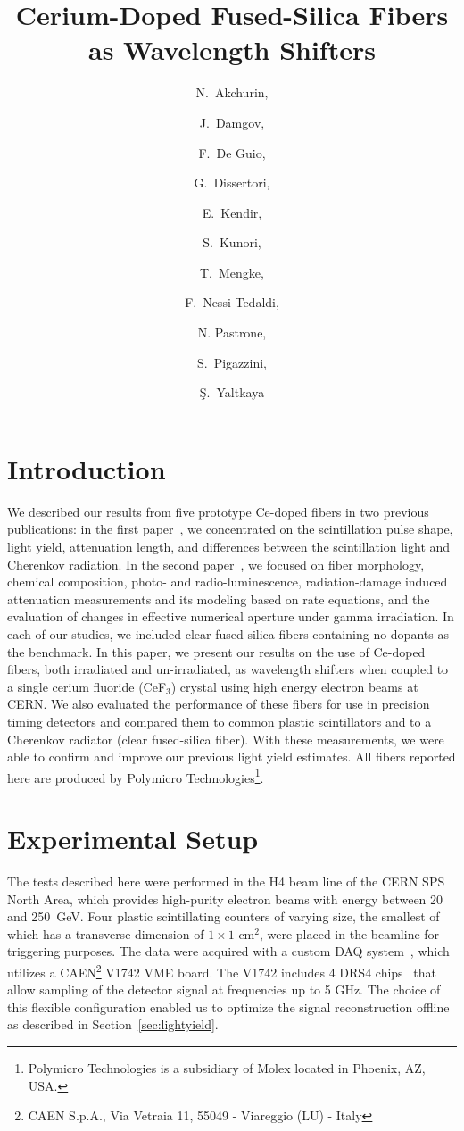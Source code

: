 \documentclass[a4paper,11pt]{article}
\title{\boldmath  Cerium-Doped Fused-Silica Fibers
as Wavelength Shifters}
\author[a,1]{N.~Akchurin,\note{Corresponding author.}}
\author[a]{J.~Damgov,}
\author[a]{F.~De Guio,}
\author[c]{G.~Dissertori,}
\author[b]{E.~Kendir,}
\author[a]{S.~Kunori,}
\author[a]{T.~Mengke,}
\author[c]{F.~Nessi-Tedaldi,}
\author[d]{N. Pastrone,}
\author[c]{S.~Pigazzini,}
\author[b]{\c{S}.~Yaltkaya}
\affiliation[a]{Texas Tech University, Department of Physics and Astronomy,  Lubbock, TX, 79409, USA}
\affiliation[b]{Akdeniz University, Department of Physics, Antalya, 07070, Turkey}
\affiliation[c]{ETH, Z\"urich, Switzerland}
\affiliation[d]{INFN-Torino, Italy}
\begin{document}
\maketitle
\flushbottom

\section{Introduction}
\label{sec:intro}
We described our results from five prototype Ce-doped fibers in two previous publications:  in the first paper~\cite{JINSTPaper}, we concentrated on the scintillation pulse shape, light yield, attenuation length, and differences between the scintillation light and Cherenkov radiation.  In the second paper~\cite{JINSTPaper2}, we focused on fiber morphology, chemical composition, photo- and radio-luminescence, radiation-damage induced attenuation measurements and its modeling based on rate equations, and the evaluation of changes in effective numerical aperture under gamma irradiation.   In each of our studies, we included clear fused-silica fibers containing no dopants  as the benchmark. In this paper, we present our results on the use of Ce-doped fibers, both irradiated and un-irradiated, as wavelength shifters when coupled to a single cerium fluoride (CeF$_3$) crystal using high energy electron beams at CERN.  We also evaluated the performance of these fibers for use in precision timing detectors and compared them to common plastic scintillators and to a Cherenkov radiator (clear fused-silica fiber).  With these measurements, we were able to confirm and improve our previous light yield estimates.  All fibers reported here are produced by Polymicro Technologies\footnote{Polymicro Technologies is a subsidiary of Molex located in Phoenix, AZ, USA.}.

\section{Experimental Setup}
\label{sec:experimentalsetup}


The tests described here were performed in the H4 beam line of the CERN SPS North Area, which provides high-purity electron beams with energy between 20 and 250~GeV.  Four plastic scintillating counters of varying size, the smallest of which has a transverse dimension of $1 \times 1$ cm$^2$, were placed in the beamline for triggering purposes.  The data were acquired with a custom DAQ system~\cite{r-MAR}, which utilizes a CAEN\footnote{CAEN S.p.A., Via Vetraia 11, 55049 - Viareggio (LU) - Italy} V1742 VME board. The V1742 includes 4 DRS4 chips~\cite{r-DRS4} that allow sampling of the detector signal at frequencies up to 5 GHz. The choice of this flexible configuration enabled us to optimize the signal reconstruction offline as described in Section~\ref{sec:lightyield}.
\end{document}
